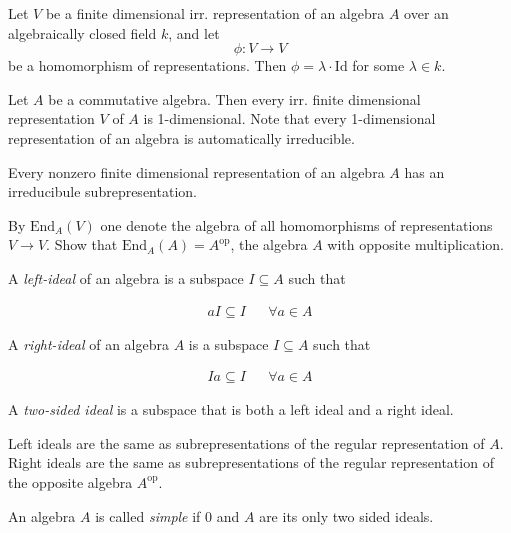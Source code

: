 \begin{thm}
Let \(V\) be a finite dimensional irr. representation of an algebra \(A\) over an algebraically closed field \(k\), and let 
$$\phi :V\rightarrow V$$
be a homomorphism of representations. Then \(\phi =\lambda \cdot \text{Id}\) for some \(\lambda \in k\).
\end{thm}

\begin{thm}
Let \(A\) be a commutative algebra. Then every irr. finite dimensional representation \(V\) of \(A\) is 1-dimensional. Note that every 1-dimensional representation of an algebra is automatically irreducible.
\end{thm}

\begin{thm}
Every nonzero finite dimensional representation of an algebra \(A\) has an irreducibule subrepresentation.
\end{thm}

\begin{thm}
By \(\text{End}_{A} (V)\) one denote the algebra of all homomorphisms of representations \(V\rightarrow V\). Show that \(\text{End}_{A} (A)=A^{\text{op}}\), the algebra \(A\) with opposite multiplication.
\end{thm}

\begin{defn}
A \emph{left-ideal} of an algebra  is a subspace \(I\subseteq A\) such that 

\begin{align*}aI\subseteq I && \forall a\in A\end{align*}

A \emph{right-ideal} of an algebra \(A\) is a subspace \(I\subseteq A\) such that 

\begin{align*}Ia\subseteq I && \forall a\in A\end{align*}

A \emph{two-sided ideal} is a subspace that is both a left ideal and a right ideal.
\end{defn}

\begin{thm}
Left ideals are the same as subrepresentations of the regular representation of \(A\). Right ideals are the same as subrepresentations of the regular representation of the opposite algebra \(A^{\text{op}}\).
\end{thm}

\begin{defn}
An algebra \(A\) is called \emph{simple} if \(0\) and \(A\) are its only two sided ideals.
\end{defn}

